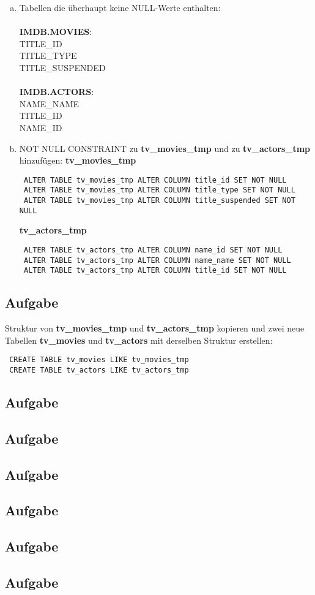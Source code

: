 \documentclass[11pt,a4paper,DIV=9]{scrartcl}
\newcounter{temp}
\newcommand{\aufgabe}[1]{
  \setcounter{temp}{\value{subsection}}
  \setcounter{subsection}{#1}
  \addtocounter{subsection}{-1}
  \subsection{Aufgabe}
  \setcounter{subsection}{\value{temp}}
}
\begin{document}
 \begin{enumerate}[a.]
 \item
 Tabellen die \"uberhaupt keine NULL-Werte enthalten: \\\\
 \textbf{IMDB.MOVIES}: \\
 TITLE\_ID \\
 TITLE\_TYPE \\
 TITLE\_SUSPENDED \\\\
 \textbf{IMDB.ACTORS}: \\
 NAME\_NAME \\
 TITLE\_ID \\
 NAME\_ID \\
 \item
 NOT NULL CONSTRAINT zu \textbf{tv\_movies\_tmp} und zu \textbf{tv\_actors\_tmp} hinzuf\"ugen: 
 \textbf{tv\_movies\_tmp}
 \begin{lstlisting}
 ALTER TABLE tv_movies_tmp ALTER COLUMN title_id SET NOT NULL
 ALTER TABLE tv_movies_tmp ALTER COLUMN title_type SET NOT NULL
 ALTER TABLE tv_movies_tmp ALTER COLUMN title_suspended SET NOT NULL
 \end{lstlisting}
 \textbf{tv\_actors\_tmp}
 \begin{lstlisting}
 ALTER TABLE tv_actors_tmp ALTER COLUMN name_id SET NOT NULL
 ALTER TABLE tv_actors_tmp ALTER COLUMN name_name SET NOT NULL
 ALTER TABLE tv_actors_tmp ALTER COLUMN title_id SET NOT NULL
 \end{lstlisting} 
 \end{enumerate}
 \aufgabe{4}
 Struktur von \textbf{tv\_movies\_tmp} und \textbf{tv\_actors\_tmp} kopieren und zwei neue Tabellen \textbf{tv\_movies} und \textbf{tv\_actors} mit derselben Struktur erstellen: 
 \begin{lstlisting}
 CREATE TABLE tv_movies LIKE tv_movies_tmp
 CREATE TABLE tv_actors LIKE tv_actors_tmp
 \end{lstlisting}
 \aufgabe{5}
 
 \aufgabe{6}
 \aufgabe{7}
 \aufgabe{8}
 \aufgabe{9}
 \aufgabe{10}
\end{document}
